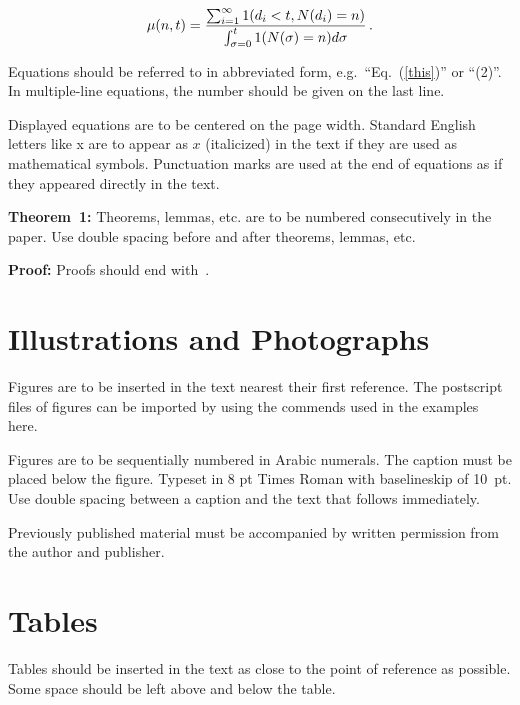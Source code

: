 \documentclass[twoside]{article}
\begin{document}
\begin{equation}
\mu(n, t) = {
\sum^\infty_{i=1} 1(d_i < t, N(d_i) = n) \over \int^t_{\sigma=0} 1(N(\sigma) 
= n)d\sigma}\,. \label{this}
\end{equation}

Equations should be referred to in abbreviated form,
e.g.~``Eq.~(\ref{this})'' or ``(2)''. In multiple-line
equations, the number should be given on the last line.

Displayed equations are to be centered on the page width.
Standard English letters like x are to appear as $x$
(italicized) in the text if they are used as mathematical
symbols. Punctuation marks are used at the end of equations as
if they appeared directly in the text.

\vspace*{12pt}
\noindent
{\bf Theorem~1:} Theorems, lemmas, etc. are to be numbered
consecutively in the paper. Use double spacing before and after
theorems, lemmas, etc.

\vspace*{12pt}
\noindent
{\bf Proof:} Proofs should end with \square\,.

\section{Illustrations and Photographs}
\noindent
Figures are to be inserted in the text nearest their first
reference. The postscript files of figures can be imported by using
the commends used in the examples here.

\begin{figure} [htbp]
\vspace*{13pt}
\centerline{} %
\vspace*{13pt}
\end{figure}

Figures are to be sequentially numbered in Arabic numerals. The
caption must be placed below the figure. Typeset in 8 pt Times
Roman with baselineskip of 10~pt. Use double spacing between a
caption and the text that follows immediately.

Previously published material must be accompanied by written
permission from the author and publisher.

\section{Tables}
\noindent
Tables should be inserted in the text as close to the point of
reference as possible. Some space should be left above and below
the table.
\end{document}
